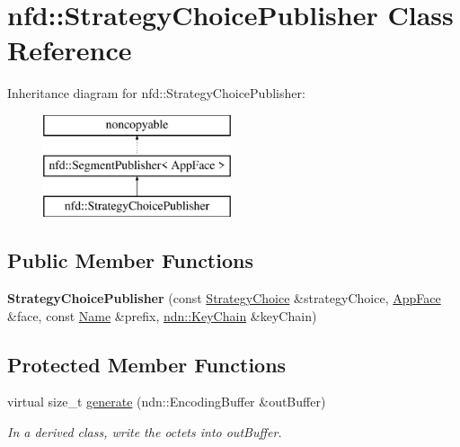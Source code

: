 \hypertarget{classnfd_1_1StrategyChoicePublisher}{}\section{nfd\+:\+:Strategy\+Choice\+Publisher Class Reference}
\label{classnfd_1_1StrategyChoicePublisher}
Inheritance diagram for nfd\+:\+:Strategy\+Choice\+Publisher\+:\begin{figure}[H]
\begin{center}
\leavevmode
\includegraphics[height=3.000000cm]{classnfd_1_1StrategyChoicePublisher}
\end{center}
\end{figure}
\subsection*{Public Member Functions}
\begin{DoxyCompactItemize}
\item 
{\bfseries Strategy\+Choice\+Publisher} (const \hyperlink{classnfd_1_1StrategyChoice}{Strategy\+Choice} \&strategy\+Choice, \hyperlink{classnfd_1_1AppFace}{App\+Face} \&face, const \hyperlink{classndn_1_1Name}{Name} \&prefix, \hyperlink{classndn_1_1security_1_1KeyChain}{ndn\+::\+Key\+Chain} \&key\+Chain)\hypertarget{classnfd_1_1StrategyChoicePublisher_a96cbadac0e39b2ad5089d4750126b9b7}{}\label{classnfd_1_1StrategyChoicePublisher_a96cbadac0e39b2ad5089d4750126b9b7}

\end{DoxyCompactItemize}
\subsection*{Protected Member Functions}
\begin{DoxyCompactItemize}
\item 
virtual size\+\_\+t \hyperlink{classnfd_1_1StrategyChoicePublisher_a8fe0dc81cc963279a6d102912518d2f1}{generate} (ndn\+::\+Encoding\+Buffer \&out\+Buffer)\hypertarget{classnfd_1_1StrategyChoicePublisher_a8fe0dc81cc963279a6d102912518d2f1}{}\label{classnfd_1_1StrategyChoicePublisher_a8fe0dc81cc963279a6d102912518d2f1}

\begin{DoxyCompactList}\small\item\em In a derived class, write the octets into out\+Buffer. \end{DoxyCompactList}\end{DoxyCompactItemize}
